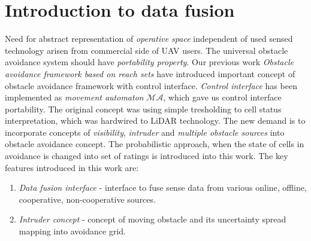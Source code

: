 \chapter{Introduction to data fusion}\label{ch:01Concept}
\noindent Need for abstract representation of \emph{operative space} independent of used sensed technology arisen from commercial side of UAV users. The universal obstacle avoidance system should have \emph{portability property}. Our previous work \emph{Obstacle avoidance framework based on reach sets} have introduced important concept of obstacle avoidance framework with control interface. \emph{Control interface}  has been implemented as \emph{movement automaton} $\mathscr{MA}$, which gave us control interface portability. The original concept was using simple tresholding to cell status interpretation, which was hardwired to LiDAR technology.  The new demand is to incorporate concepts of \emph{visibility}, \emph{intruder} and \emph{multiple obstacle sources} into obstacle avoidance concept. The probabilistic approach, when the state of cells in avoidance is changed into set of ratings is introduced into this work. The key features introduced in this work are:
\begin{enumerate}
    \item\emph{Data fusion interface} - interface to fuse sense data from various online, offline, cooperative, non-cooperative sources.
    \item\emph{Intruder concept} - concept of moving obstacle and its uncertainty spread mapping into avoidance grid.
\end{enumerate}

